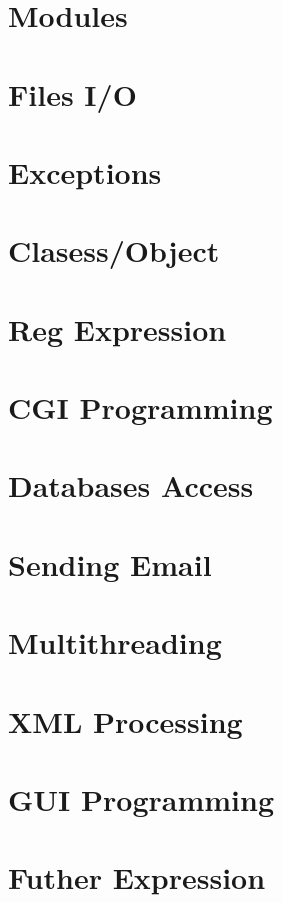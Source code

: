 \documentclass{wileySix}
\begin{document}
\chapter{Modules}

\chapter{Files I/O}

\chapter{Exceptions}

\chapter{Clasess/Object}

\chapter{Reg Expression}

\chapter{CGI Programming}


\chapter{Databases Access}

 
\chapter{Sending Email}

\chapter{Multithreading}


\chapter{XML Processing}


\chapter{GUI Programming}


\chapter{Futher Expression}

\end{document}
